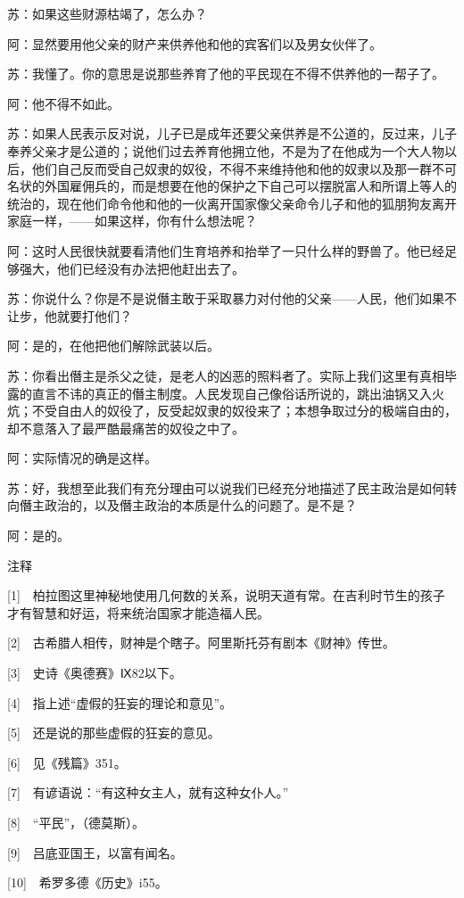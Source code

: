 \documentclass[12pt,oneside]{book}
\begin{document}
苏：如果这些财源枯竭了，怎么办？

阿：显然要用他父亲的财产来供养他和他的宾客们以及男女伙伴了。

苏：我懂了。你的意思是说那些养育了他的平民现在不得不供养他的一帮子了。

阿：他不得不如此。

苏：如果人民表示反对说，儿子已是成年还要父亲供养是不公道的，反过来，儿子奉养父亲才是公道的；说他们过去养育他拥立他，不是为了在他成为一个大人物以后，他们自己反而受自己奴隶的奴役，不得不来维持他和他的奴隶以及那一群不可名状的外国雇佣兵的，而是想要在他的保护之下自己可以摆脱富人和所谓上等人的统治的，现在他们命令他和他的一伙离开国家像父亲命令儿子和他的狐朋狗友离开家庭一样，——如果这样，你有什么想法呢？

阿：这时人民很快就要看清他们生育培养和抬举了一只什么样的野兽了。他已经足够强大，他们已经没有办法把他赶出去了。

苏：你说什么？你是不是说僭主敢于采取暴力对付他的父亲——人民，他们如果不让步，他就要打他们？

阿：是的，在他把他们解除武装以后。

苏：你看出僭主是杀父之徒，是老人的凶恶的照料者了。实际上我们这里有真相毕露的直言不讳的真正的僭主制度。人民发现自己像俗话所说的，跳出油锅又入火炕；不受自由人的奴役了，反受起奴隶的奴役来了；本想争取过分的极端自由的，却不意落入了最严酷最痛苦的奴役之中了。

阿：实际情况的确是这样。

苏：好，我想至此我们有充分理由可以说我们已经充分地描述了民主政治是如何转向僭主政治的，以及僭主政治的本质是什么的问题了。是不是？

阿：是的。

注释

[1]　柏拉图这里神秘地使用几何数的关系，说明天道有常。在吉利时节生的孩子才有智慧和好运，将来统治国家才能造福人民。

[2]　古希腊人相传，财神是个瞎子。阿里斯托芬有剧本《财神》传世。

[3]　史诗《奥德赛》Ⅸ82以下。

[4]　指上述“虚假的狂妄的理论和意见”。

[5]　还是说的那些虚假的狂妄的意见。

[6]　见《残篇》351。

[7]　有谚语说：“有这种女主人，就有这种女仆人。”

[8]　“平民”，（德莫斯）。

[9]　吕底亚国王，以富有闻名。

[10]　希罗多德《历史》i55。
\end{document}
